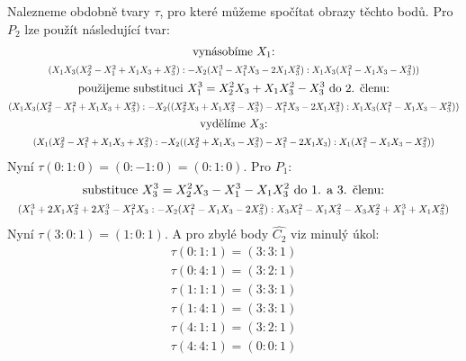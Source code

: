 \documentclass[12pt, a4paper]{article}
\begin{document}
\begin{enumerate}
    Nalezneme obdobně tvary $\tau$, pro které můžeme spočítat obrazy těchto bodů. Pro $P_2$ lze použít následující tvar:
    \begin{gather*}
    \text{vynásobíme $X_1$:}\\
    \scalebox{.8}{$(X_1X_3(X_2^2-X_1^2+X_1X_3+X_3^2) : -X_2(X_1^3-X_1^2X_3-2X_1X_3^2) : X_1X_3(X_1^2-X_1X_3-X_3^2))$}\\
    \text{použijeme substituci $X_1^3 = X_2^2X_3 + X_1X_3^2-X_3^3$ do 2. členu:}\\
    \scalebox{.8}{$(X_1X_3(X_2^2-X_1^2+X_1X_3+X_3^2) : -X_2((X_2^2X_3 + X_1X_3^2-X_3^3)-X_1^2X_3-2X_1X_3^2) : X_1X_3(X_1^2-X_1X_3-X_3^2))$}\\
    \text{vydělíme $X_3$:}\\
    \scalebox{.8}{$(X_1(X_2^2-X_1^2+X_1X_3+X_3^2) : -X_2((X_2^2 + X_1X_3-X_3^2)-X_1^2-2X_1X_3) : X_1(X_1^2-X_1X_3-X_3^2))$}\\
    \end{gather*}
    Nyní $\tau(0:1:0) = (0:-1:0) = (0:1:0)$. Pro $P_1:$
    \begin{gather*}
    \text{substituce $X_3^3 = X_2^2X_3-X_1^3-X_1X_3^2$ do 1. a 3. členu:}\\
    \scalebox{.8}{$(X_1^3+2X_1X_3^2+2X_3^3-X_1^2X_3 : -X_2(X_1^2-X_1X_3-2X_3^2) : X_3X_1^2-X_1X_3^2-X_3X_2^2+X_1^3+X_1X_3^2)$}\\
    \end{gather*}
    Nyní $\tau(3:0:1) = (1:0:1)$. 
    A pro zbylé body $\hat{C_2}$ viz minulý úkol:
    \begin{gather*}
        \tau(0:1:1) = (3:3:1)\\
        \tau(0:4:1) = (3:2:1)\\
        \tau(1:1:1) = (3:3:1)\\
        \tau(1:4:1) = (3:3:1)\\
        \tau(4:1:1) = (3:2:1)\\
        \tau(4:4:1) = (0:0:1)\\
    \end{gather*}
\end{enumerate}
\end{document}
